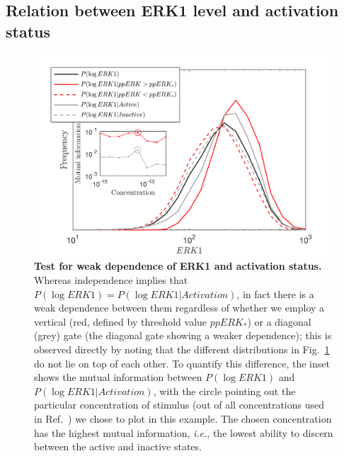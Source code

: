 \documentclass[11pt,a4paper,final]{article}
\begin{document}
\subsection*{Relation between ERK1 level and activation status}
\begin{figure}[!htb]
 \centering
   \includegraphics[width=1\linewidth]{Fig7.png}  
  \caption{{\bf Test for weak dependence of ERK1 and activation status.} Whereas independence implies that $P(\log ERK1) = P(\log ERK1 \vert Activation)$, in fact there is a weak dependence between them regardless of whether we employ a vertical (red, defined by threshold value $ppERK_*$) or a diagonal (grey) gate (the diagonal gate showing a weaker dependence); this is observed directly by noting that the different distributions in Fig.~\ref{S1_Fig} do not lie on top of each other. To quantify this difference, the inset shows the mutual information between $P(\log ERK1)$ and $P(\log ERK1 | Activation)$, with the circle pointing out the particular concentration of stimulus (out of all concentrations used in Ref.~\cite{Feinerman2008}) we chose to plot in this example. The chosen concentration has the highest mutual information, {\it i.e.}, the lowest ability to discern between the active and inactive states.}
  \label{S1_Fig}
\end{figure}
\end{document}
